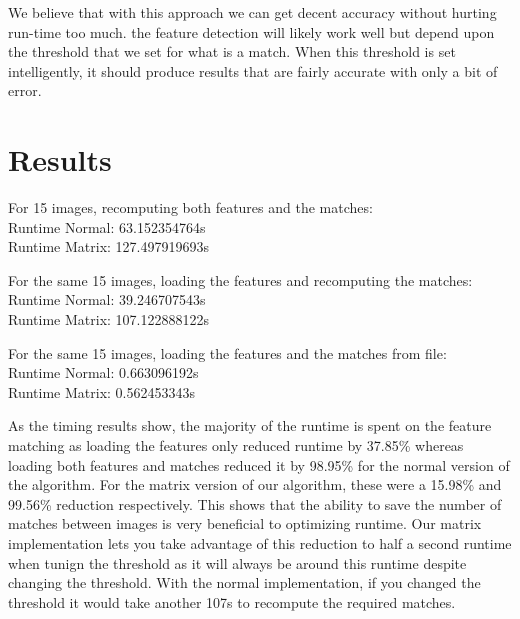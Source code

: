 \documentclass[12pt]{article}
\begin{document}
We believe that with this approach we can get decent accuracy without hurting run-time too much. the feature detection will likely work well but depend upon the threshold that we set for what is a match. When this threshold is set intelligently, it should produce results that are fairly accurate with only a bit of error.


\section{Results}

	For 15 images, recomputing both features and the matches: \\
	Runtime Normal: 63.152354764s \\
	Runtime Matrix: 127.497919693s
	
	For the same 15 images, loading the features and recomputing the matches: \\
	Runtime Normal: 39.246707543s \\
	Runtime Matrix: 107.122888122s
	
	For the same 15 images, loading the features and the matches from file: \\
	Runtime Normal: 0.663096192s \\
	Runtime Matrix: 0.562453343s
	
	As the timing results show, the majority of the runtime is spent on the feature matching as loading the features only reduced runtime by 37.85\% whereas loading both features and matches reduced it by 98.95\% for the normal version of the algorithm. For the matrix version of our algorithm, these were a 15.98\% and 99.56\% reduction respectively. This shows that the ability to save the number of matches between images is very beneficial to optimizing runtime. Our matrix implementation lets you take advantage of this reduction to half a second runtime when tunign the threshold as it will always be around this runtime despite changing the threshold. With the normal implementation, if you changed the threshold it would take another 107s to recompute the required matches.
\end{document}
